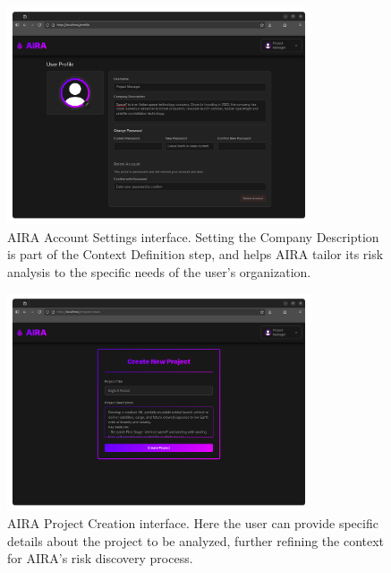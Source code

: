 \begin{figure}[H]
    \centering
    \includegraphics[width=0.8\textwidth]{figures/screenshots/settings.png}
    \caption{AIRA Account Settings interface. Setting 
    the Company Description is part of the Context 
    Definition step, and helps AIRA tailor its risk 
    analysis to the specific needs of the user's 
    organization.}
    \label{fig:settings}
\end{figure}

\begin{figure}[H]
    \centering
    \includegraphics[width=0.8\textwidth]{figures/screenshots/project_creation.png}
    \caption{AIRA Project Creation interface. Here the 
    user can provide specific details about the project
    to be analyzed, further refining the context for
    AIRA's risk discovery process.}
    \label{fig:project_creation}
\end{figure}

